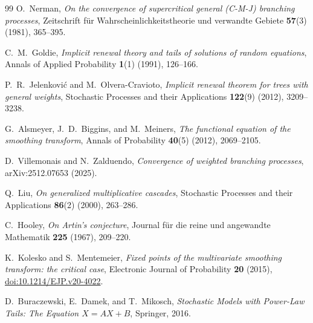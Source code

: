 \documentclass[11pt]{article}
\theoremstyle{remark}
\begin{document}
\begin{thebibliography}{99}
 O.\ Nerman, \emph{On the convergence of
  supercritical general (C-M-J) branching processes}, Zeitschrift
  f\"ur Wahrscheinlichkeitstheorie und verwandte Gebiete
  \textbf{57}(3) (1981), 365--395.

 C.\ M.\ Goldie, \emph{Implicit renewal theory and
  tails of solutions of random equations}, Annals of Applied
  Probability \textbf{1}(1) (1991), 126--166.

 P.\ R.\ Jelenkovi\'c and
  M.\ Olvera-Cravioto, \emph{Implicit renewal theorem for trees with
  general weights}, Stochastic Processes and their Applications
  \textbf{122}(9) (2012), 3209--3238.

 G.\ Alsmeyer, J.\ D.\ Biggins, and
  M.\ Meiners, \emph{The functional equation of the smoothing
  transform}, Annals of Probability \textbf{40}(5) (2012), 2069--2105.

 D.\ Villemonais and N.\ Zalduendo,
  \emph{Convergence of weighted branching processes}, arXiv:2512.07653
  (2025).

 Q.\ Liu, \emph{On generalized multiplicative
  cascades}, Stochastic Processes and their Applications
  \textbf{86}(2) (2000), 263--286.

 C.\ Hooley, \emph{On Artin's conjecture}, Journal
  f\"ur die reine und angewandte Mathematik \textbf{225} (1967),
  209--220.

 K.\ Kolesko and S.\ Mentemeier,
  \emph{Fixed points of the multivariate smoothing transform: the
  critical case}, Electronic Journal of Probability \textbf{20}
  (2015), \href{https://doi.org/10.1214/EJP.v20-4022}{doi:10.1214/EJP.v20-4022}.

 D.\ Buraczewski, E.\ Damek, and
  T.\ Mikosch, \emph{Stochastic Models with Power-Law Tails: The
  Equation $X=AX+B$}, Springer, 2016.

\end{thebibliography}
\end{document}
